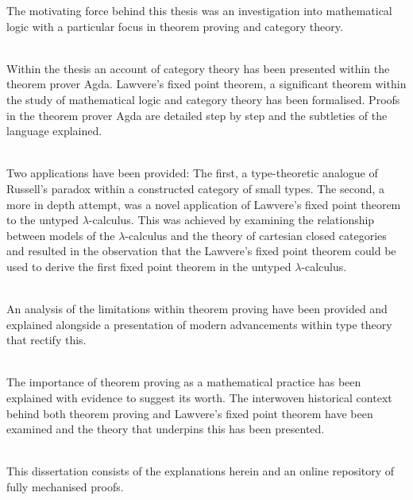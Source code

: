 \vspace{1cm}
\noindent
The motivating force behind this thesis was an investigation into mathematical
logic with a particular focus in theorem proving and category theory.

~\\
Within the thesis an account of category theory has been presented within the
theorem prover Agda. Lawvere's fixed point theorem, a significant theorem
within the study of mathematical logic and  category theory has been
formalised. Proofs in the theorem prover Agda are detailed step by step and the
subtleties of the language explained.

~\\
Two applications have been provided: The first, a type-theoretic analogue of
Russell's paradox within a constructed category of small types. The second, a
more in depth attempt, was a novel application of Lawvere's fixed point theorem
to the untyped $\lambda$-calculus. This was achieved by examining the
relationship between models of the $\lambda$-calculus and the theory of
cartesian closed categories and resulted in the observation that the Lawvere's
fixed point theorem could be used to derive the first fixed point theorem in
the untyped $\lambda$-calculus.

~\\
An analysis of the limitations within theorem proving have been provided and
explained alongside a presentation of modern advancements within type theory
that rectify this.

~\\
The importance of theorem proving as a mathematical practice has been explained
with evidence to suggest its worth. The interwoven historical context behind
both theorem proving and Lawvere's fixed point theorem have been examined and
the theory that underpins this has been presented.

~\\
This dissertation consists of the explanations herein and an online repository
of fully mechanised proofs.

